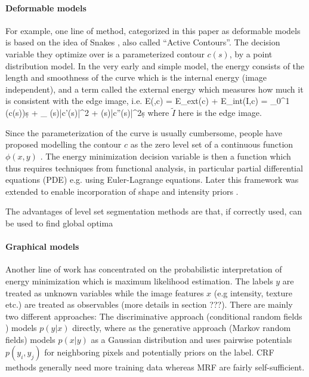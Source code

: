 \documentclass{article} %
\begin{document}
\paragraph{Deformable models}
For example, one line of method, categorized in this paper as deformable models is based on the idea of Snakes \cite{Kass88_Snakes, Cootes92_ActiveShape,Cootes01_ActiveApp, Cootes92_TrainingShape}, also called ``Active Contours''. The decision variable they optimize over is a parameterized contour $c(s)$, by a point distribution model. In the very early and simple model, the energy consists of the length and smoothness of the curve which is the internal energy (image independent), and a term called the external energy which measures how much it is consistent with the edge image, i.e.
\beqs
E(,c) = E_{ext}(c) + E_{int}(I,c) = \int_0^1 (c(s))\d s  + \int_{\Omega} \alpha(s)|c'(s)|^2 + \beta(s)|c''(s)|^2\d s
\eeqs
where $\tilde{I}$ here is the edge image.

\cite{Sclaroff01_RegionGroup, ElBaz09_ShapeApp}
Since the parameterization of the curve is usually cumbersome, people have proposed modelling the contour $c$ as the zero level set of a continuous function $\phi(x,y)$ \cite{Caselles97_Geodesic, Leventon00_ShapeGeodesic, ChanVese01, MumfordShah89,Cremers07_Levelreview, Tsai03_MILevelSets}. The energy minimization decision variable is then a function which thus requires techniques from functional analysis, in particular partial differential equations (PDE) e.g. using Euler-Lagrange equations. Later this framework was extended to enable incorporation of shape and intensity priors \cite{Cremers06_KernelDensity, Chan05_LevelShape, Chen09_LevelShapeIntensity}.

The advantages of level set segmentation methods are that, if correctly used, can be used to find global optima 

\paragraph{Graphical models}
Another line of work has concentrated on the probabilistic interpretation of energy minimization which is maximum likelihood estimation. The labels $y$ are treated as unknown variables while the image features $x$ (e.g intensity, texture etc.) are treated as observables (more details in section ???). There are mainly two different approaches: The discriminative approach (conditional random fields \cite{Lafferty01_CRFSeq, KaeSohn13_CRF}) models $p(y|x)$ directly, where as the generative approach (Markov random fields) models $p(x|y)$ as a Gaussian distribution and uses pairwise potentials $p(y_i,y_j)$ for neighboring pixels and potentially priors on the label. CRF methods generally need more training data whereas MRF are fairly self-sufficient.
\end{document}
